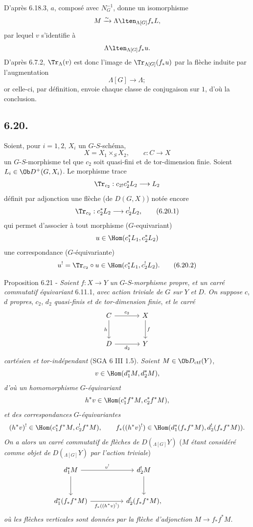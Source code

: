 D'après 6.18.3, $a$,
composé avec $N_G^{-1}$, donne un isomorphisme
\[
M\xrightarrow{\sim}\Lambda\lten_{\Lambda[G]}f_*L,
\]
par lequel $v$ s'identifie à
\[
\Lambda\lten_{\Lambda[G]}f_*u.
\]
D'après 6.7.2, $\Tr_{\Lambda}(v)$ est donc l'image de $\Tr_{\Lambda[G]}(f_*u)$ par la flèche induite par l'augmentation
\[
\Lambda[G]\longrightarrow \Lambda;
\]
or celle-ci, par définition, envoie chaque classe de conjugaison sur $1$, d'où la conclusion.

\subsection*{6.20.}
Soient, pour $i=1,2$, $X_i$ un $G$-$S$-schéma,
\[
X=X_1\times_SX_2,\qquad c:C\to X
\]
un $G$-$S$-morphisme tel que $c_2$ soit quasi-fini et de tor-dimension finie. Soient $L_i\in\Ob D^+(G,X_i)$. Le morphisme trace
\[
\Tr_{c_2}:c_{2!}c_2^*L_2\longrightarrow L_2
\]
définit par adjonction une flèche (de $D(G,X)$) notée encore
\begin{equation}
\Tr_{c_2}:c_2^*L_2\longrightarrow c_2^!L_2,
\tag{6.20.1}
\end{equation}
qui permet d'associer à tout morphisme ($G$-equivariant)
\[
u\in\Hom(c_1^*L_1,c_2^*L_2)
\]
une correspondance ($G$-équivariante)
\begin{equation}
u^! = \Tr_{c_2}\circ u\in\Hom(c_1^*L_1,c_2^!L_2).
\tag{6.20.2}
\end{equation}

\begin{statement}{Proposition 6.21 -}
\emph{Soient} $f:X\to Y$ \emph{un} $G$-$S$-\emph{morphisme propre}, \emph{et un carré commutatif équivariant} 6.11.1, \emph{avec action triviale de} $G$ \emph{sur} $Y$ \emph{et} $D$. \emph{On suppose} $c$, $d$ \emph{propres}, $c_2$, $d_2$ \emph{quasi-finis et de tor-dimension finie}, \emph{et le carré}
\[
\begin{tikzcd}[column sep=large,row sep=large]
C \arrow[r,"c_2"] \arrow[d,"h"'] & X \arrow[d,"f"]\\
D \arrow[r,"d_2"'] & Y
\end{tikzcd}
\]
\emph{cartésien et tor-indépendant} (SGA 6 III 1.5). \emph{Soient} $M\in\Ob D_{\mathrm{ctf}}(Y)$,
\[
v\in\Hom(d_1^*M,d_2^*M),
\]
\emph{d'où un homomorphisme} $G$-\emph{équivariant}
\[
h^*v\in\Hom(c_1^*f^*M,c_2^*f^*M),
\]
\emph{et des correspondances} $G$-\emph{équivariantes}
\[
(h^*v)^!\in\Hom(c_1^*f^*M,c_2^!f^*M),
\qquad
f_*((h^*v)^!)\in\Hom(d_1^*(f_*f^*M),d_2^!(f_*f^*M)).
\]
\emph{On a alors un carré commutatif de flèches de} $D({}_{\Lambda[G]}Y)$ ($M$ \emph{étant considéré comme objet de} $D({}_{\Lambda[G]}Y)$ \emph{par l'action triviale})
\[
\begin{tikzcd}[column sep=huge,row sep=large]
d_1^*M \arrow[r,"v^!"] \arrow[d] & d_2^!M \arrow[d] & {}\\
d_1^*(f_*f^*M) \arrow[r,"f_*((h^*v)^!)"'] & d_2^!(f_*f^*M),
\end{tikzcd}
\]
\emph{où les
flèches verticales sont données par la flèche d'adjonction} $M\to f_*f^*M$.
\end{statement}

